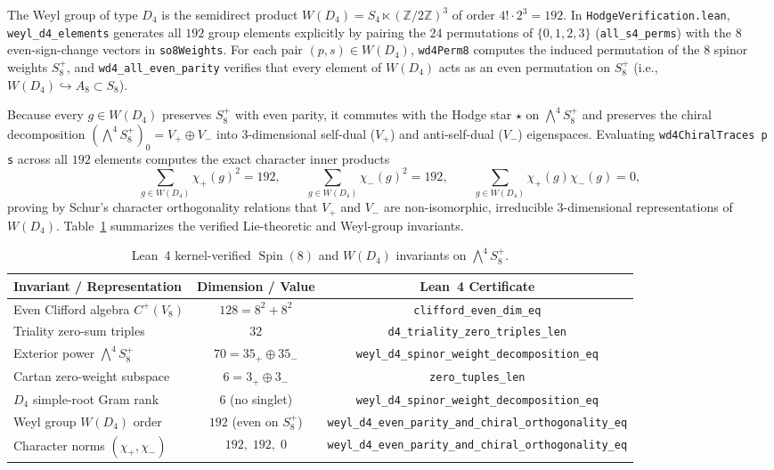 \documentclass[11pt,a4paper]{article}
\begin{document}
The Weyl group of type $D_4$ is the semidirect product $W(D_4) = S_4 \ltimes (\mathbb{Z}/2\mathbb{Z})^3$ of order $4! \cdot 2^3 = 192$. In \texttt{HodgeVerification.lean}, \texttt{weyl\_d4\_elements} generates all $192$ group elements explicitly by pairing the $24$ permutations of $\{0, 1, 2, 3\}$ (\texttt{all\_s4\_perms}) with the $8$ even-sign-change vectors in \texttt{so8Weights}. For each pair $(p, s) \in W(D_4)$, \texttt{wd4Perm8} computes the induced permutation of the $8$ spinor weights $S^+_8$, and \texttt{wd4\_all\_even\_parity} verifies that every element of $W(D_4)$ acts as an even permutation on $S^+_8$ (i.e., $W(D_4) \hookrightarrow A_8 \subset S_8$).

Because every $g \in W(D_4)$ preserves $S^+_8$ with even parity, it commutes with the Hodge star $\star$ on $\bigwedge^4 S^+_8$ and preserves the chiral decomposition $(\bigwedge^4 S^+_8)_0 = V_+ \oplus V_-$ into $3$-dimensional self-dual ($V_+$) and anti-self-dual ($V_-$) eigenspaces. Evaluating \texttt{wd4ChiralTraces p s} across all $192$ elements computes the exact character inner products
\begin{equation}
  \sum_{g \in W(D_4)} \chi_+(g)^2 = 192, \qquad \sum_{g \in W(D_4)} \chi_-(g)^2 = 192, \qquad \sum_{g \in W(D_4)} \chi_+(g) \chi_-(g) = 0,
\end{equation}
proving by Schur's character orthogonality relations that $V_+$ and $V_-$ are non-isomorphic, irreducible $3$-dimensional representations of $W(D_4)$. Table~\ref{tab:wd4_summary} summarizes the verified Lie-theoretic and Weyl-group invariants.

\begin{table}[htbp]
  \centering
  \small
  \setlength{\tabcolsep}{3pt}
  \caption{Lean~4 kernel-verified $\operatorname{Spin}(8)$ and $W(D_4)$ invariants on $\bigwedge^4 S^+_8$.}
  \label{tab:wd4_summary}
  \begin{tabular}{lcc}
    \toprule
    Invariant / Representation & Dimension / Value & Lean~4 Certificate \\
    \midrule
    Even Clifford algebra $C^+(V_8)$ & $128 = 8^2 + 8^2$ & \footnotesize\texttt{clifford\_even\_dim\_eq} \\
    Triality zero-sum triples & $32$ & \footnotesize\texttt{d4\_triality\_zero\_triples\_len} \\
    Exterior power $\bigwedge^4 S^+_8$ & $70 = 35_+ \oplus 35_-$ & \footnotesize\texttt{weyl\_d4\_spinor\_weight\_decomposition\_eq} \\
    Cartan zero-weight subspace & $6 = 3_+ \oplus 3_-$ & \footnotesize\texttt{zero\_tuples\_len} \\
    $D_4$ simple-root Gram rank & $6$ (no singlet) & \footnotesize\texttt{weyl\_d4\_spinor\_weight\_decomposition\_eq} \\
    Weyl group $W(D_4)$ order & $192$ (even on $S^+_8$) & \footnotesize\texttt{weyl\_d4\_even\_parity\_and\_chiral\_orthogonality\_eq} \\
    Character norms $(\chi_+, \chi_-)$ & $192,\; 192,\; 0$ & \footnotesize\texttt{weyl\_d4\_even\_parity\_and\_chiral\_orthogonality\_eq} \\
    \bottomrule
  \end{tabular}
\end{table}
\end{document}
